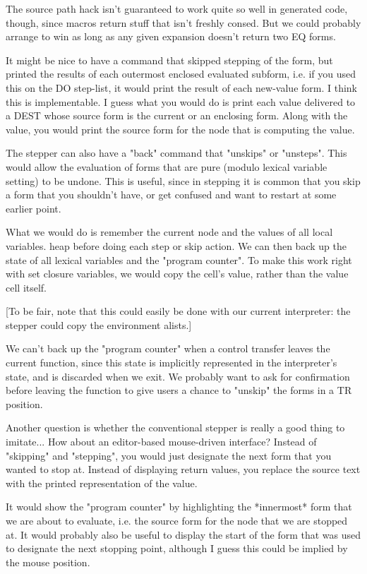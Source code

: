 The source path hack isn't guaranteed to work quite so well in generated code,
though, since macros return stuff that isn't freshly consed.  But we could
probably arrange to win as long as any given expansion doesn't return two EQ
forms.

It might be nice to have a command that skipped stepping of the form, but
printed the results of each outermost enclosed evaluated subform, i.e. if you
used this on the DO step-list, it would print the result of each new-value
form.  I think this is implementable.  I guess what you would do is print each
value delivered to a DEST whose source form is the current or an enclosing
form.  Along with the value, you would print the source form for the node that
is computing the value.

The stepper can also have a "back" command that "unskips" or "unsteps".  This
would allow the evaluation of forms that are pure (modulo lexical variable
setting) to be undone.  This is useful, since in stepping it is common that you
skip a form that you shouldn't have, or get confused and want to restart at
some earlier point.

What we would do is remember the current node and the values of all local
variables.  heap before doing each step or skip action.  We can then back up
the state of all lexical variables and the "program counter".  To make this
work right with set closure variables, we would copy the cell's value, rather
than the value cell itself.

[To be fair, note that this could easily be done with our current interpreter:
the stepper could copy the environment alists.]

We can't back up the "program counter" when a control transfer leaves the
current function, since this state is implicitly represented in the
interpreter's state, and is discarded when we exit.  We probably want to ask
for confirmation before leaving the function to give users a chance to "unskip"
the forms in a TR position.

Another question is whether the conventional stepper is really a good thing to
imitate...  How about an editor-based mouse-driven interface?  Instead of
"skipping" and "stepping", you would just designate the next form that you
wanted to stop at.  Instead of displaying return values, you replace the source
text with the printed representation of the value.

It would show the "program counter" by highlighting the *innermost* form that
we are about to evaluate, i.e. the source form for the node that we are stopped
at.  It would probably also be useful to display the start of the form that was
used to designate the next stopping point, although I guess this could be
implied by the mouse position.


